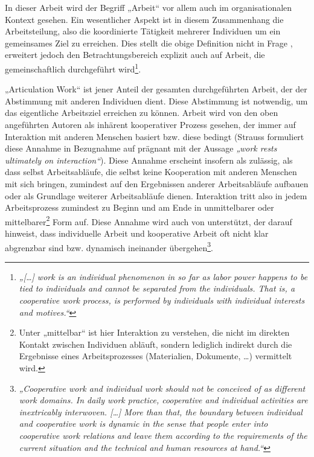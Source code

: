 In dieser Arbeit wird der Begriff „Arbeit“ vor allem auch im organisationalen Kontext gesehen. Ein wesentlicher Aspekt ist in diesem Zusammenhang die Arbeitsteilung, also die koordinierte Tätigkeit mehrerer Individuen um ein gemeinsames Ziel zu erreichen. Dies stellt die obige Definition nicht in Frage \citep{Schmidt94}, erweitert jedoch den Betrachtungsbereich explizit auch auf Arbeit, die gemeinschaftlich durchgeführt wird\footnote{\emph{„[\ldots] work is an individual phenomenon in so far as labor power happens to be tied to individuals and cannot be separated from the individuals. That is, a cooperative work process, is performed by individuals with individual interests and motives.“}\citep[][S. 353]{Schmidt94}}. 

„Articulation Work“ ist jener Anteil der gesamten durchgeführten Arbeit, der der Abstimmung mit anderen Individuen dient. Diese Abstimmung ist notwendig, um das eigentliche Arbeitsziel erreichen zu können. Arbeit wird von den oben angeführten Autoren als inhärent kooperativer Prozess gesehen, der immer auf Interaktion mit anderen Menschen basiert bzw. diese bedingt (Strauss formuliert diese Annahme in Bezugnahme auf \citet{Hughes71} prägnant mit der Aussage \emph{„work rests ultimately on interaction“}). Diese Annahme erscheint insofern als zulässig, als dass selbst Arbeitsabläufe, die selbst keine Kooperation mit anderen Menschen mit sich bringen, zumindest auf den Ergebnissen anderer Arbeitsabläufe aufbauen oder als Grundlage weiterer Arbeitsabläufe dienen. Interaktion tritt also in jedem Arbeitsprozess zumindest zu Beginn und am Ende in unmittelbarer oder mittelbarer\footnote{Unter „mittelbar“ ist hier Interaktion zu verstehen, die nicht im direkten Kontakt zwischen Individuen abläuft, sondern lediglich indirekt durch die Ergebnisse eines Arbeitsprozesses (Materialien, Dokumente, \ldots) vermittelt wird.} Form auf. Diese Annahme wird  auch von \citet{Schmidt94} unterstützt, der darauf hinweist, dass individuelle Arbeit und kooperative Arbeit oft nicht klar abgrenzbar sind bzw. dynamisch ineinander übergehen\footnote{\emph{„Cooperative work and individual work should not be conceived of as different work domains. In daily work practice, cooperative and individual activities are inextricably interwoven. [\ldots] More than that, the boundary between individual and cooperative work is dynamic in the sense that people enter into cooperative work relations and leave them according to the requirements of the current situation and the technical and human resources at hand.“}\citep[][S. 352]{Schmidt94}}.

